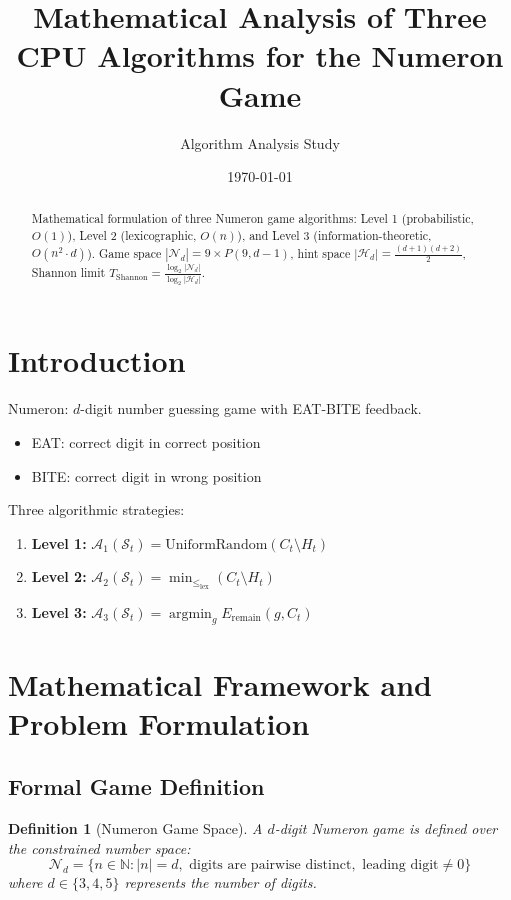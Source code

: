 \documentclass{article}
\title{Mathematical Analysis of Three CPU Algorithms for the Numeron Game}
\author{Algorithm Analysis Study}
\date{\today}
\DeclareMathOperator*{\argmin}{argmin}
\newtheorem{definition}{Definition}
\begin{document}
\maketitle

\begin{abstract}
Mathematical formulation of three Numeron game algorithms: Level 1 (probabilistic, $O(1)$), Level 2 (lexicographic, $O(n)$), and Level 3 (information-theoretic, $O(n^2 \cdot d)$). Game space $|\mathcal{N}_d| = 9 \times P(9, d-1)$, hint space $|\mathcal{H}_d| = \frac{(d+1)(d+2)}{2}$, Shannon limit $T_{\text{Shannon}} = \frac{\log_2 |\mathcal{N}_d|}{\log_2 |\mathcal{H}_d|}$.
\end{abstract}

\section{Introduction}

Numeron: $d$-digit number guessing game with EAT-BITE feedback.
\begin{itemize}
\item EAT: correct digit in correct position
\item BITE: correct digit in wrong position
\end{itemize}

Three algorithmic strategies:
\begin{enumerate}
\item \textbf{Level 1:} $\mathcal{A}_1(\mathcal{S}_t) = \text{UniformRandom}(C_t \setminus H_t)$
\item \textbf{Level 2:} $\mathcal{A}_2(\mathcal{S}_t) = \min_{\leq_{\text{lex}}} (C_t \setminus H_t)$
\item \textbf{Level 3:} $\mathcal{A}_3(\mathcal{S}_t) = \argmin_{g} E_{\text{remain}}(g, C_t)$
\end{enumerate}

\section{Mathematical Framework and Problem Formulation}

\subsection{Formal Game Definition}

\begin{definition}[Numeron Game Space]
A $d$-digit Numeron game is defined over the constrained number space:
$$\mathcal{N}_d = \{n \in \mathbb{N} : |n| = d, \text{ digits are pairwise distinct}, \text{ leading digit} \neq 0\}$$
where $d \in \{3, 4, 5\}$ represents the number of digits.
\end{definition}
\end{document}
